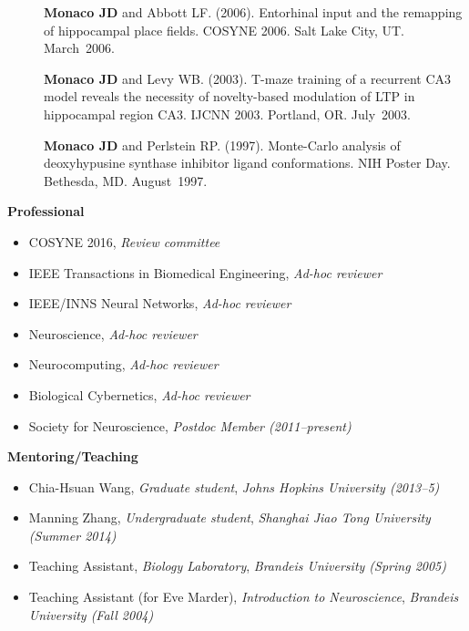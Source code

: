 \documentclass[10pt]{article}
\begin{document}
\begin{description}
\item[\quad] \textbf{Monaco JD} and Abbott LF. (2006). Entorhinal input and the remapping of hippocampal place fields. COSYNE 2006. Salt Lake City, UT. March~2006.
\item[\quad] \textbf{Monaco JD} and Levy WB. (2003). T-maze training of a recurrent CA3 model reveals the necessity of novelty-based modulation of LTP in hippocampal region CA3. IJCNN 2003. Portland, OR. July~2003.
\item[\quad] \textbf{Monaco JD} and Perlstein RP. (1997). Monte-Carlo analysis of deoxyhypusine synthase inhibitor ligand conformations. NIH Poster Day. Bethesda, MD. August~1997. 
\end{description}

{\large \textbf{Professional}}
\begin{itemize}
  \item COSYNE 2016, \emph{Review committee}
  \item IEEE Transactions in Biomedical Engineering, \emph{Ad-hoc reviewer}
  \item IEEE/INNS Neural Networks, \emph{Ad-hoc reviewer}
  \item Neuroscience, \emph{Ad-hoc reviewer}
  \item Neurocomputing, \emph{Ad-hoc reviewer}
  \item Biological Cybernetics, \emph{Ad-hoc reviewer}
  \item Society for Neuroscience, \emph{Postdoc Member (2011--present)}
\end{itemize}
  
{\large \textbf{Mentoring/Teaching}}
\begin{itemize}
  \item Chia-Hsuan Wang, \emph{Graduate student}, \emph{Johns Hopkins University (2013--5)}
  \item Manning Zhang, \emph{Undergraduate student}, \emph{Shanghai Jiao Tong University (Summer 2014)}
  \item Teaching Assistant, \emph{Biology Laboratory}, \emph{Brandeis University (Spring 2005)}
  \item Teaching Assistant (for Eve Marder), \emph{Introduction to Neuroscience}, \emph{Brandeis University (Fall 2004)}
\end{itemize}

\end{document}
